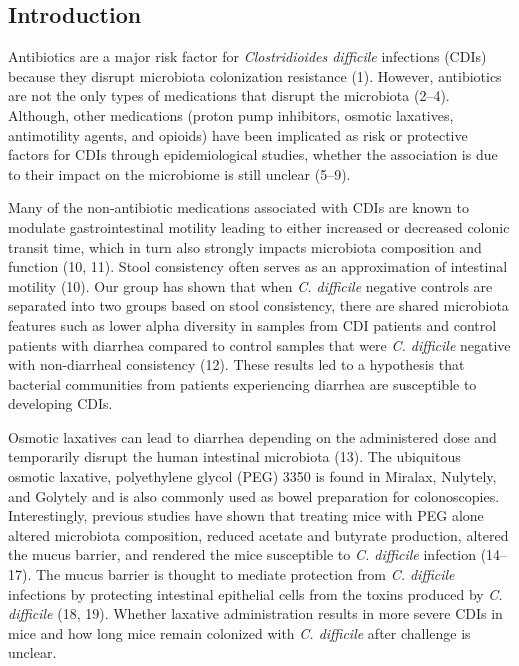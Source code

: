 \documentclass[
  11pt,
]{article}
\begin{document}
\newpage

\hypertarget{introduction}{%
\subsection{Introduction}\label{introduction}}

Antibiotics are a major risk factor for \emph{Clostridioides difficile}
infections (CDIs) because they disrupt microbiota colonization
resistance (1). However, antibiotics are not the only types of
medications that disrupt the microbiota (2--4). Although, other
medications (proton pump inhibitors, osmotic laxatives, antimotility
agents, and opioids) have been implicated as risk or protective factors
for CDIs through epidemiological studies, whether the association is due
to their impact on the microbiome is still unclear (5--9).

Many of the non-antibiotic medications associated with CDIs are known to
modulate gastrointestinal motility leading to either increased or
decreased colonic transit time, which in turn also strongly impacts
microbiota composition and function (10, 11). Stool consistency often
serves as an approximation of intestinal motility (10). Our group has
shown that when \emph{C. difficile} negative controls are separated into
two groups based on stool consistency, there are shared microbiota
features such as lower alpha diversity in samples from CDI patients and
control patients with diarrhea compared to control samples that were
\emph{C. difficile} negative with non-diarrheal consistency (12). These
results led to a hypothesis that bacterial communities from patients
experiencing diarrhea are susceptible to developing CDIs.

Osmotic laxatives can lead to diarrhea depending on the administered
dose and temporarily disrupt the human intestinal microbiota (13). The
ubiquitous osmotic laxative, polyethylene glycol (PEG) 3350 is found in
Miralax, Nulytely, and Golytely and is also commonly used as bowel
preparation for colonoscopies. Interestingly, previous studies have
shown that treating mice with PEG alone altered microbiota composition,
reduced acetate and butyrate production, altered the mucus barrier, and
rendered the mice susceptible to \emph{C. difficile} infection (14--17).
The mucus barrier is thought to mediate protection from \emph{C.
difficile} infections by protecting intestinal epithelial cells from the
toxins produced by \emph{C. difficile} (18, 19). Whether laxative
administration results in more severe CDIs in mice and how long mice
remain colonized with \emph{C. difficile} after challenge is unclear.
\end{document}
